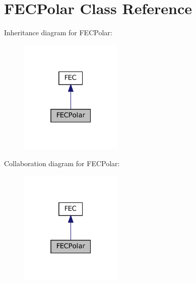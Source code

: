 \hypertarget{classFECPolar}{}\section{F\+E\+C\+Polar Class Reference}
\label{classFECPolar}


Inheritance diagram for F\+E\+C\+Polar\+:
\nopagebreak
\begin{figure}[H]
\begin{center}
\leavevmode
\includegraphics[width=139pt]{classFECPolar__inherit__graph}
\end{center}
\end{figure}


Collaboration diagram for F\+E\+C\+Polar\+:
\nopagebreak
\begin{figure}[H]
\begin{center}
\leavevmode
\includegraphics[width=139pt]{classFECPolar__coll__graph}
\end{center}
\end{figure}
